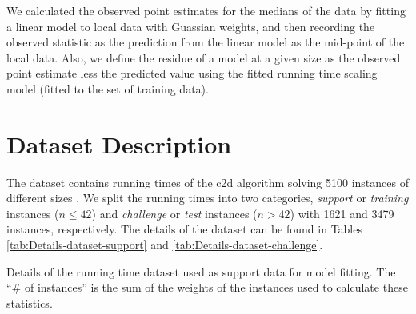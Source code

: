 We calculated the observed point estimates for the medians of the
data by fitting a linear model to local data with Guassian weights, and
then recording the observed statistic as the prediction from the linear
model as the mid-point of the local data.
Also, we define the residue of a model at a given size as the observed
point estimate less the
predicted value using the fitted running time scaling model (fitted to
the set of training data).


\section{Dataset Description}

The dataset contains running times of the c2d algorithm solving
5100 instances of different sizes . We split the
running times into two categories, \emph{support} or \emph{training}
instances ($n\leq42$) and \emph{challenge} or
\emph{test} instances ($n>42$) with 1621
and 3479 instances, respectively. The
details of the dataset can be found in Tables \ref{tab:Details-dataset-support}
and \ref{tab:Details-dataset-challenge}.
\begin{table*}
\noindent \begin{centering}

\par\end{centering}

\caption{\label{tab:Details-dataset-support} Details of the running time
dataset used as support data for model fitting.
 The ``\# of instances'' is the
sum of the weights of the instances used to calculate these statistics.}
\end{table*}

